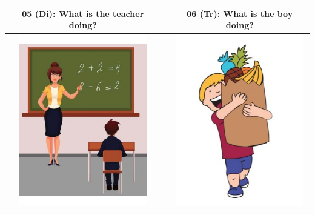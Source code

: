\begin{tabular}{|c|c|c|}
\hline
05 (Di): What is the teacher doing? && 06 (Tr): What is the boy doing? \\
\hline
\includegraphics[width=15em,trim=0 0 0 -3]{figures/I05.jpg} & & \includegraphics[width=15em,trim=0 0 0 -3]{figures/I06.jpg} \\
\hline
\end{tabular}
\vspace{1em} \\


